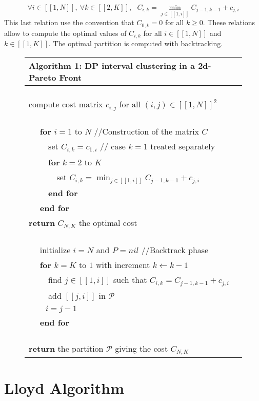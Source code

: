 \documentclass{meta}
\def\PP{{\mathcal{P}}}
\begin{document}
\begin{equation}\label{inducForm}
\forall i \in [\![1,N]\!], \: \forall k \in [\![2,K]\!], \:\:\: C_{i,k} = \min_{j \in [\![1,i]\!]} C_{j-1,k-1} + c_{j,i}
\end{equation}
This last relation use the convention that $C_{0,k} = 0$ for all $k\geqslant0$.
These relations allow to compute the optimal values of $C_{i,k}$ for all $i \in [\![1,N]\!]$ and  $k \in [\![1,K]\!]$. The optimal partition is computed with backtracking.

\begin{figure}[ht]
 \centering 
\begin{tabular}{ l }
\hline
\textbf{Algorithm 1: DP interval clustering in a 2d-Pareto Front }\\
\hline
\verb!  !\\

compute cost matrix $c_{i,j}$ for all $(i,j) \in   [\![1,N]\!]^2$\\


\verb!  !\\

\verb!  ! \textbf{for} $i=1$ to $N$  //Construction of the matrix $C$\\
\verb!    ! set $C_{i,k} = c_{1,i}$  // case $k=1$ treated separately\\
\verb!    ! \textbf{for} $k=2$ to $K$ \\
\verb!      ! set $C_{i,k} = \min_{j \in [\![1,i]\!]} C_{j-1,k-1} + c_{j,i}$\\
\verb!    ! \textbf{end for} \\
\verb!  ! \textbf{end for} \\
\textbf{return} $C_{N,K}$ the optimal cost \\

\verb!  !\\

\verb!  !     initialize $i=N$ and $P=nil$  //Backtrack phase\\
\verb!  ! \textbf{for} $k=K$ to $1$ with increment $k \leftarrow k-1$\\
\verb!    ! find $j\in [\![1,i]\!]$ such that $C_{i,k} = C_{j-1,k-1} + c_{j,i}$\\
\verb!    ! add $[\![j,i]\!]$ in $\PP$\\
\verb!    ! %
$i=j-1$\\
\verb!  ! \textbf{end for} \\

\verb!  !\\

\textbf{return} the partition $\PP$ giving the cost $C_{N,K}$\\
\hline
\end{tabular}
\end{figure}

\section{ Lloyd Algorithm }
\end{document}

